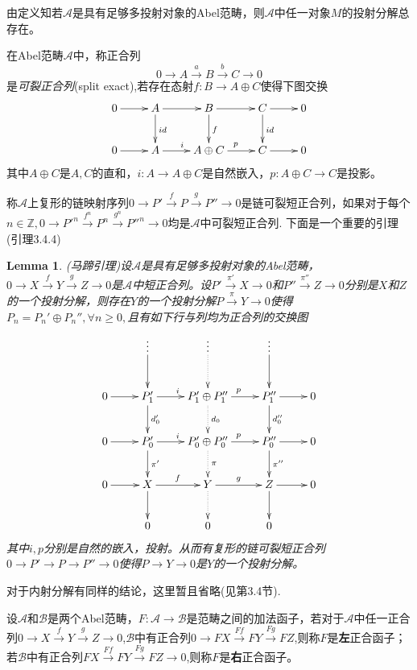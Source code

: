 \documentclass[UTF8]{article}
\newtheorem{lem}{Lemma}[section]
\begin{document}
由定义知若$\mathcal{A}$是具有足够多投射对象的Abel范畴，则$\mathcal{A}$中任一对象$M$的投射分解总存在。

在Abel范畴$\mathcal{A}$中，称正合列
$$
0\rightarrow A\stackrel{a}{\rightarrow}B\stackrel{b}{\rightarrow}C\rightarrow 0
$$
是\emph{可裂正合列}(split exact),若存在态射$f:B\rightarrow A\oplus C$使得下图交换
$$
\xymatrix{
0\ar[r]&A\ar[d]^{id}\ar[r]&B\ar[d]^{f}\ar[r]&C\ar[d]^{id}\ar[r]&0\\
0\ar[r]&A\ar[r]^{i}&A\oplus C\ar[r]^{p}&C\ar[r]&0
}
$$
其中$A\oplus C$是$A,C$的直和，$i:A\rightarrow A\oplus C$是自然嵌入，$p:A\oplus C\rightarrow C$是投影。

称$\mathcal{A}$上复形的链映射序列$0\rightarrow P'\stackrel{f}{\rightarrow}P\stackrel{g}{\rightarrow}P''\rightarrow 0
$是链可裂短正合列，如果对于每个$n\in\mathbb{Z},0\rightarrow P'^{n}\stackrel{f^{n}}{\rightarrow}P^{n}\stackrel{g^{n}}{\rightarrow}P''^{n}\rightarrow 0$均是$\mathcal{A}$中可裂短正合列.
下面是一个重要的引理(\cite{zh}引理3.4.4)
\begin{lem}
	(马蹄引理)设$\mathcal{A}$是具有足够多投射对象的Abel范畴，$0\rightarrow X\stackrel{f}{\rightarrow}Y\stackrel{g}{\rightarrow}Z\rightarrow 0
	$是$\mathcal{A}$中短正合列。设$P'\stackrel{\pi'}{\rightarrow}X\rightarrow 0$和$P''\stackrel{\pi''}{\rightarrow}Z\rightarrow 0$分别是$X$和$Z$的一个投射分解，则存在$Y$的一个投射分解$P\stackrel{\pi}{\rightarrow}Y\rightarrow0$使得$P_{n}=P_{n}'\oplus P_{n}'',\forall n\geq 0,$且有如下行与列均为正合列的交换图
	$$
	\xymatrix{
     	&\vdots\ar[d]            & \vdots \ar@{.>}[d]  & \vdots\ar[d]  &   \\
0\ar[r]&P_{1}'\ar[r]^{i}\ar[d]^{d_{0}'}&P_{1}'\oplus P_{1}''\ar[r]^{p}\ar@{.>}[d]^{d_{0}}&P_{1}''\ar[r]\ar[d]^{d_{0}''}& 0\\
0\ar[r]&P_{0}'\ar[r]^{i}\ar[d]^{\pi'}&P_{0}'\oplus P_{0}''\ar[r]^{p}\ar@{.>}[d]^{\pi}&P_{0}''\ar[r]\ar[d]^{\pi''}& 0\\
0\ar[r]&X\ar[r]^{f}\ar[d]&Y\ar[r]^{g}\ar@{.>}[d]&Z\ar[r]\ar[d]&0\\
&0&0&0&
}
$$
其中$i,p$分别是自然的嵌入，投射。从而有复形的链可裂短正合列$0\rightarrow P'\rightarrow P\rightarrow P''\rightarrow 0$使得$P\rightarrow Y\rightarrow 0$是$Y$的一个投射分解。
	\end{lem}
对于内射分解有同样的结论，这里暂且省略(见\cite{zh}第3.4节).

设$\mathcal{A}$和$\mathcal{B}$是两个Abel范畴，$F:\mathcal{A}\rightarrow\mathcal{B}$是范畴之间的加法函子，若对于$\mathcal{A}$中任一正合列$0\rightarrow X\stackrel{f}{\rightarrow}Y\stackrel{g}{\rightarrow}Z\rightarrow 0$,$\mathcal{B}$中有正合列$0\rightarrow FX\stackrel{Ff}{\longrightarrow}FY\stackrel{Fg}{\longrightarrow}FZ$,则称$F$是\textbf{左}正合函子；若$\mathcal{B}$中有正合列$ FX\stackrel{Ff}{\longrightarrow}FY\stackrel{Fg}{\longrightarrow}FZ\longrightarrow 0$,则称$F$是\textbf{右}正合函子。
\end{document}
